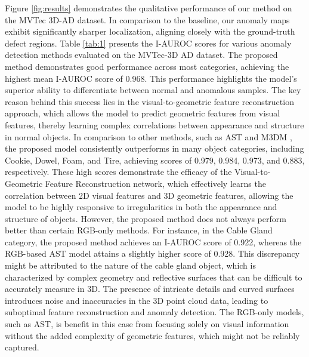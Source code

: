 Figure \ref{fig:results} demonstrates the qualitative performance of our method on the MVTec 3D-AD dataset. In comparison to the baseline, our anomaly maps exhibit significantly sharper localization, aligning closely with the ground-truth defect regions. Table \ref{tab:1} presents the I-AUROC scores for various anomaly detection methods evaluated on the MVTec-3D AD dataset. The proposed method demonstrates good performance across most categories, achieving the highest mean I-AUROC score of 0.968. This performance highlights the model's superior ability to differentiate between normal and anomalous samples. The key reason behind this success lies in the visual-to-geometric feature reconstruction approach, which allows the model to predict geometric features from visual features, thereby learning complex correlations between appearance and structure in normal objects. In comparison to other methods, such as AST \cite{rudolph2023asymmetric} and M3DM \cite{wang2023multimodal}, the proposed model consistently outperforms in many object categories, including Cookie, Dowel, Foam, and Tire, achieving scores of 0.979, 0.984, 0.973, and 0.883, respectively. These high scores demonstrate the efficacy of the Visual-to-Geometric Feature Reconstruction network, which effectively learns the correlation between 2D visual features and 3D geometric features, allowing the model to be highly responsive to irregularities in both the appearance and structure of objects. However, the proposed method does not always perform better than certain RGB-only methods. For instance, in the Cable Gland category, the proposed method achieves an I-AUROC score of 0.922, whereas the RGB-based AST model attains a slightly higher score of 0.928. This discrepancy might be attributed to the nature of the cable gland object, which is characterized by complex geometry and reflective surfaces that can be difficult to accurately measure in 3D. The presence of intricate details and curved surfaces introduces noise and inaccuracies in the 3D point cloud data, leading to suboptimal feature reconstruction and anomaly detection. The RGB-only models, such as AST, is benefit in this case from focusing solely on visual information without the added complexity of geometric features, which might not be reliably captured.

